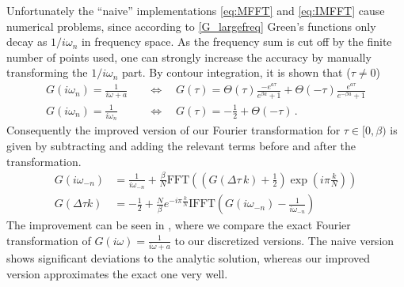 \begin{appendix}
Unfortunately the ``naive'' implementations \eqref{eq:MFFT} and \eqref{eq:IMFFT} cause numerical problems, since according to \eqref{G_largefreq} Green's functions only decay as $1/ i\omega_n$ in frequency space. As the frequency sum is cut off by the finite number of points used, one can strongly increase the accuracy by manually transforming the $1/ i\omega_n$ part. By contour integration, it is shown that ($\tau \neq 0$)
%
\begin{align}
G(i\omega_n) = \frac{1}{i\omega + a}
\quad &\Leftrightarrow \quad
G(\tau) = \Theta(\tau) \frac{- e^{a \tau}}{e^{\beta a}+1} + \Theta(-\tau) \frac{e^{a \tau}}{e^{-\beta a}+1} 
\\
	G(i ω_n) =\frac{1}{i ω_n} \quad &⇔ \quad G(τ)=-\frac{1}{2} + \Theta(-\tau)
	\label{eq:ff_pair}
\, .
\end{align}
Consequently the improved version of our Fourier transformation for $τ∈[0,β)$ is given by subtracting and adding the relevant terms before and after the transformation.
\begin{align}
	G(i ω_{-n})&= \frac{1}{i ω_{-n}}+\frac{\beta}{N} \mathrm{FFT}\left( \left(G(\Delta τ \, k)+\frac{1}{2}\right)\exp{\left(i π \frac{k}{N}\right)}\right)\\
	G(\Delta τ k)&= -\frac{1}{2}+\frac{N}{β} e^{-i π \frac{k}{N}}\mathrm{IFFT}\left(G(iω_{-n})-\frac{1}{i ω_{-n}}\right)
	\label{eq:improved_fft}
\end{align}
The improvement can be seen in , where we compare the exact Fourier transformation of $G(i ω)=\frac{1}{iω+a}$ to our discretized versions. The naive version shows significant deviations to the analytic solution, whereas our improved version approximates the exact one very well.  

\clearpage

\end{appendix}
